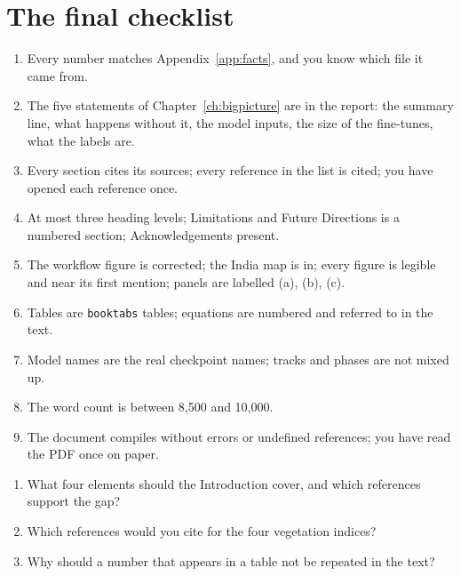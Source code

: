 \section{The final checklist}
\label{sec:finalcheck}

\begin{enumerate}
  \item Every number matches Appendix~\ref{app:facts}, and you know which file it came from.
  \item The five statements of Chapter~\ref{ch:bigpicture} are in the report: the summary line, what happens without it, the model inputs, the size of the fine-tunes, what the labels are.
  \item Every section cites its sources; every reference in the list is cited; you have opened each reference once.
  \item At most three heading levels; Limitations and Future Directions is a numbered section; Acknowledgements present.
  \item The workflow figure is corrected; the India map is in; every figure is legible and near its first mention; panels are labelled (a), (b), (c).
  \item Tables are \texttt{booktabs} tables; equations are numbered and referred to in the text.
  \item Model names are the real checkpoint names; tracks and phases are not mixed up.
  \item The word count is between 8,500 and 10,000.
  \item The document compiles without errors or undefined references; you have read the PDF once on paper.
\end{enumerate}

\begin{selfcheck}
\begin{enumerate}
  \item What four elements should the Introduction cover, and which references support the gap?
  \item Which references would you cite for the four vegetation indices?
  \item Why should a number that appears in a table not be repeated in the text?
\end{enumerate}
\end{selfcheck}

